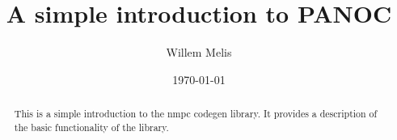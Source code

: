 \documentclass[]{article}
\title{A simple introduction to PANOC}
\author{Willem Melis}
\date{\today}
\begin{document}
\maketitle
\begin{abstract}
This is a simple introduction to the nmpc codegen library. It provides a description of the basic functionality of the library.
\end{abstract}







\clearpage


	
\clearpage
\appendix 


%
%
\end{document}
